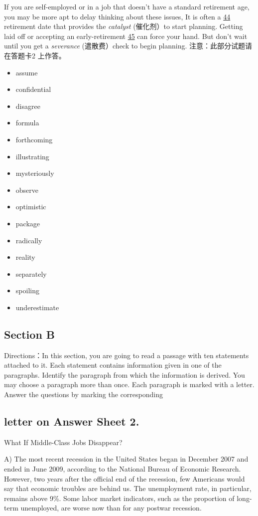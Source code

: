 \documentclass[UTF8,11pt]{ctexart}
\begin{document}
If you are self-employed or in a job that doesn’t have a standard retirement age, you may be more apt to delay thinking about these issues, It is often a \uline{44} retirement date that provides the\textit{ catalyst} (催化剂）to start planning. Getting laid off or accepting an early-retirement \uline{45} can force your hand. But don’t wait until you get a\textit{ severance} (遣散费）check to begin planning. 注意：此部分试题请在答题卡2 上作答。


\begin{itemize}[leftmargin=2em,itemsep=.2em,topsep=.4em]\item[A.] assume
\item[B.] confidential
\item[C.] disagree
\item[D.] formula
\item[E.] forthcoming
\item[F.] illustrating
\item[G.] mysteriously
\item[H.] observe
\item[I.] optimistic
\item[J.] package
\item[K.] radically
\item[L.] reality
\item[M.] separately
\item[N.] spoiling
\item[O.] underestimate
\end{itemize}

\subsection*{Section B}


Directions：In this section, you are going to read a passage with ten statements attached to it. Each statement contains information given in one of the paragraphs. Identify the paragraph from which the information is derived. You may choose a paragraph more than once. Each paragraph is marked with a letter. Answer the questions by marking the corresponding


\subsection*{letter on\textbf{ Answer Sheet} \textbf{2}.}


What If Middle-Class Jobs Disappear?


A) The most recent recession in the United States began in December 2007 and ended in June 2009, according to the National Bureau of Economic Research. However, two years after the official end of the recession, few Americans would say that economic troubles are behind us. The unemployment rate, in particular, remains above 9\%. Some labor market indicators, such as the proportion of long-term unemployed, are worse now than for any postwar recession.
\end{document}

